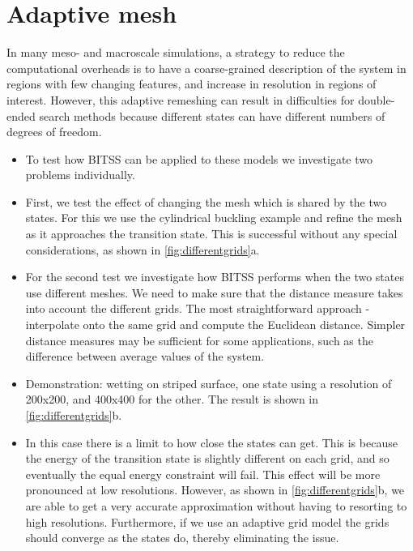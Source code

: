 \documentclass[aps,twocolumn]{revtex4}
\begin{document}
\section{Adaptive mesh}
In many meso- and macroscale simulations, a strategy to reduce the computational overheads is to have a coarse-grained description of the system in regions with few changing features, and increase in resolution in regions of interest.
However, this adaptive remeshing can result in difficulties for double-ended search methods because different states can have different numbers of degrees of freedom.

\begin{itemize}
\item
To test how BITSS can be applied to these models we investigate two problems individually.
\item
First, we test the effect of changing the mesh which is shared by the two states.
For this we use the cylindrical buckling example and refine the mesh as it approaches the transition state.
This is successful without any special considerations, as shown in \cref{fig:differentgrids}a.
\item
For the second test we investigate how BITSS performs when the two states use different meshes.
We need to make sure that the distance measure takes into account the different grids.
The most straightforward approach - interpolate onto the same grid and compute the Euclidean distance.
Simpler distance measures may be sufficient for some applications, such as the difference between average values of the system.
\item
Demonstration: wetting on striped surface, one state using a resolution of 200x200, and 400x400 for the other.
The result is shown in \cref{fig:differentgrids}b.
\item
In this case there is a limit to how close the states can get.
This is because the energy of the transition state is slightly different on each grid, and so eventually the equal energy constraint will fail.
This effect will be more pronounced at low resolutions.
However, as shown in \cref{fig:differentgrids}b, we are able to get a very accurate approximation without having to resorting to high resolutions.
Furthermore, if we use an adaptive grid model the grids should converge as the states do, thereby eliminating the issue.
\end{itemize}
\end{document}
